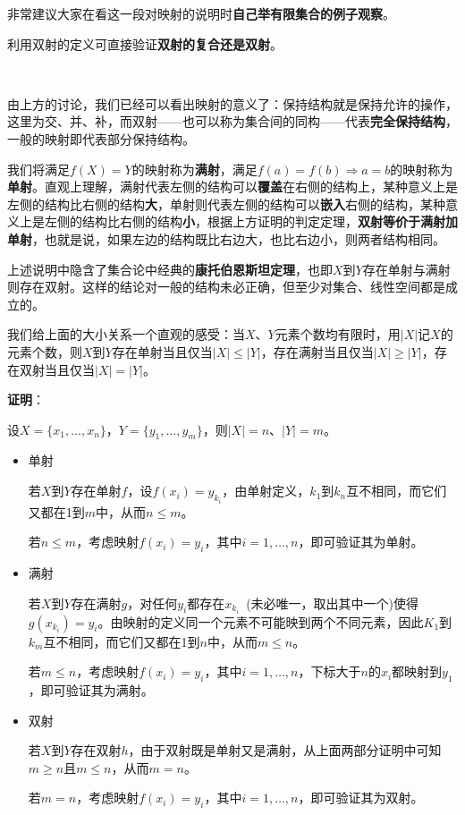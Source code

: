 \documentclass[a4paper,UTF8,fontset=windows,AutoFakeBold]{ctexart}
\newcommand*{\note}{\noindent *}
\newcommand{\proo}[1]{{\vspace{5pt}\kaishu\noindent\textbf{证明}：\vspace{-3pt}
\begin{compactitem}
    \item[] #1
\end{compactitem}
}}
\begin{document}
\note 非常建议大家在看这一段对映射的说明时\textbf{自己举有限集合的例子观察}。

\note 利用双射的定义可直接验证\textbf{双射的复合还是双射}。

\

由上方的讨论，我们已经可以看出映射的意义了：保持结构就是保持允许的操作，这里为交、并、补，而双射——也可以称为集合间的同构——代表\textbf{完全保持结构}，一般的映射即代表部分保持结构。

我们将满足$f(X)=Y$的映射称为\textbf{满射}，满足$f(a)=f(b)\Rightarrow a=b$的映射称为\textbf{单射}。直观上理解，满射代表左侧的结构可以\textbf{覆盖}在右侧的结构上，某种意义上是左侧的结构比右侧的结构\textbf{大}，单射则代表左侧的结构可以\textbf{嵌入}右侧的结构，某种意义上是左侧的结构比右侧的结构\textbf{小}，根据上方证明的判定定理，\textbf{双射等价于满射加单射}，也就是说，如果左边的结构既比右边大，也比右边小，则两者结构相同。

\note 上述说明中隐含了集合论中经典的\textbf{康托伯恩斯坦定理}，也即$X$到$Y$存在单射与满射则存在双射。这样的结论对一般的结构未必正确，但至少对集合、线性空间都是成立的。

我们给上面的大小关系一个直观的感受：当$X$、$Y$元素个数均有限时，用$|X|$记$X$的元素个数，则$X$到$Y$存在单射当且仅当$|X|\le|Y|$，存在满射当且仅当$|X|\ge|Y|$，存在双射当且仅当$|X|=|Y|$。

\proo{
    设$X=\{x_1,\dots,x_n\}$，$Y=\{y_1,\dots,y_m\}$，则$|X|=n$、$|Y|=m$。

    \begin{itemize}
        \item 单射
        
        若$X$到$Y$存在单射$f$，设$f(x_i)=y_{k_i}$，由单射定义，$k_1$到$k_n$互不相同，而它们又都在1到$m$中，从而$n\le m$。

        若$n\le m$，考虑映射$f(x_i)=y_i$，其中$i=1,\dots,n$，即可验证其为单射。

        \item 满射
        
        若$X$到$Y$存在满射$g$，对任何$y_i$都存在$x_{k_i}$\ (未必唯一，取出其中一个)使得$g(x_{k_i})=y_i$。由映射的定义同一个元素不可能映到两个不同元素，因此$K_1$到$k_m$互不相同，而它们又都在1到$n$中，从而$m\le n$。

        若$m\le n$，考虑映射$f(x_i)=y_i$，其中$i=1,\dots,n$，下标大于$n$的$x_i$都映射到$y_1$，即可验证其为满射。

        \item 双射
        
        若$X$到$Y$存在双射$h$，由于双射既是单射又是满射，从上面两部分证明中可知$m\ge n$且$m\le n$，从而$m=n$。

        若$m=n$，考虑映射$f(x_i)=y_i$，其中$i=1,\dots,n$，即可验证其为双射。
    \end{itemize}
}
\end{document}
